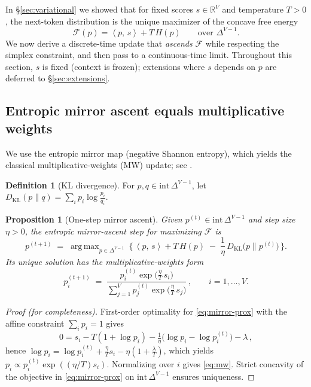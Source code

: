 \documentclass[11pt,reqno]{article}
\numberwithin{equation}{section}
\theoremstyle{plain}
\newtheorem{proposition}[theorem]{Proposition}
\theoremstyle{definition}
\newtheorem{definition}[theorem]{Definition}
\theoremstyle{remark}
\DeclareMathOperator*{\argmax}{arg\,max}
\DeclareMathOperator{\KL}{KL}
\newcommand{\R}{\mathbb{R}}
\newcommand{\1}{\mathbbm{1}}
\newcommand{\ip}[2]{\left\langle #1,\, #2 \right\rangle}
\newcommand{\Hent}{H}
\newcommand{\simplex}{\Delta^{V-1}}
\begin{document}
In \S\ref{sec:variational} we showed that for fixed scores $s\in\R^V$ and temperature $T>0$, the next-token distribution is the unique maximizer of the concave free energy
\[
\mathcal{F}(p)=\ip{p}{s}+T\,\Hent(p)\qquad \text{over }\simplex.
\]
We now derive a discrete-time update that \emph{ascends} $\mathcal{F}$ while respecting the simplex constraint, and then pass to a continuous-time limit. Throughout this section, $s$ is fixed (context is frozen); extensions where $s$ depends on $p$ are deferred to \S\ref{sec:extensions}.

\subsection{Entropic mirror ascent equals multiplicative weights}
We use the entropic mirror map (negative Shannon entropy), which yields the classical multiplicative-weights (MW) update; see \citet{beck2003mirror,arora2012multiplicative,raginsky2012mirror}.

\begin{definition}[KL divergence]
For $p,q\in\mathrm{int}\,\simplex$, let $D_{\KL}(p\|q)=\sum_i p_i\log\!\frac{p_i}{q_i}$.
\end{definition}

\begin{proposition}[One-step mirror ascent]\label{prop:mirror-step}
Given $p^{(t)}\in\mathrm{int}\,\simplex$ and step size $\eta>0$, the entropic mirror-ascent step for maximizing $\mathcal{F}$ is
\begin{equation}\label{eq:mirror-prox}
p^{(t+1)} \;=\; \argmax_{p\in\simplex}\ \Big\{\, \ip{p}{s} + T\,\Hent(p)\;-\;\frac{1}{\eta}\,D_{\KL}\!\big(p\|p^{(t)}\big)\,\Big\}.
\end{equation}
Its unique solution has the multiplicative-weights form
\begin{equation}\label{eq:mw}
p^{(t+1)}_i \;=\; \frac{p^{(t)}_i \exp\!\big(\tfrac{\eta}{T}\,s_i\big)}{\sum_{j=1}^V p^{(t)}_j \exp\!\big(\tfrac{\eta}{T}\,s_j\big)}\,,\qquad i=1,\dots,V.
\end{equation}
\end{proposition}

\begin{proof}[Proof (for completeness)]
First-order optimality for \eqref{eq:mirror-prox} with the affine constraint $\sum_i p_i=1$ gives
\[
0 = s_i - T(1+\log p_i) - \tfrac{1}{\eta}\big(\log p_i - \log p^{(t)}_i\big) - \lambda\,,
\]
hence $\log p_i = \log p^{(t)}_i + \tfrac{\eta}{T}s_i - \eta(1+\tfrac{\lambda}{T})$, which yields
$p_i \propto p^{(t)}_i \exp((\eta/T)s_i)$. Normalizing over $i$ gives \eqref{eq:mw}. Strict concavity of the objective in \eqref{eq:mirror-prox} on $\mathrm{int}\,\simplex$ ensures uniqueness.
\end{proof}
\end{document}
